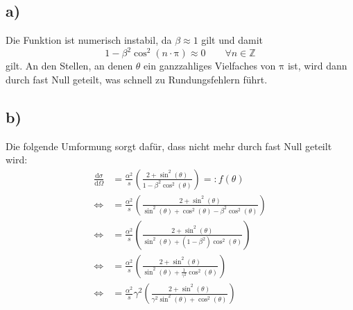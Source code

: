 \documentclass[a4paper, 11pt]{article}
\begin{document}
\subsection*{a)}
Die Funktion ist numerisch instabil, da $\beta \approx 1$ gilt und damit
\begin{equation}
    1 - \beta^2 \cos^2\left(n\cdot\mathrm{\pi}\right) \approx 0 \qquad\forall n \in \mathbb{Z}
\end{equation}
gilt.
An den Stellen, an denen $\theta$ ein ganzzahliges Vielfaches von $\mathrm{\pi}$ ist, wird dann durch fast Null geteilt, was schnell zu Rundungsfehlern führt.
\subsection*{b)}
Die folgende Umformung sorgt dafür, dass nicht mehr durch fast Null geteilt wird:
\begin{align}
    \frac{\mathrm{d}\sigma}{\mathrm{d}\Omega} &= \frac{\alpha^2}{s}
    \left(\frac{2+\sin^2\left(\theta\right)}{1-\beta^2 \cos^2\left(\theta\right)}\right) =: f\left(\theta\right)\\
    \Leftrightarrow &= \frac{\alpha^2}{s} \left(\frac{2+\sin^2\left(\theta\right)}{\sin^2\left(\theta\right)+\cos^2\left(\theta\right)-\beta^2 \cos^2\left(\theta\right)}\right)\\
    \Leftrightarrow &= \frac{\alpha^2}{s} \left(\frac{2+\sin^2\left(\theta\right)}{\sin^2\left(\theta\right)+\left(1-\beta^2\right)\cos^2\left(\theta\right)}\right)\\
    \Leftrightarrow &= \frac{\alpha^2}{s} \left(\frac{2+\sin^2\left(\theta\right)}{\sin^2\left(\theta\right)+\frac{1}{\gamma^2}\cos^2\left(\theta\right)}\right)\\
    \Leftrightarrow &= \frac{\alpha^2}{s} \gamma^2 \left(\frac{2+\sin^2\left(\theta\right)}{\gamma^2\sin^2\left(\theta\right)+\cos^2\left(\theta\right)}\right)
    \label{eqn:dsdogut}
\end{align}
\end{document}
